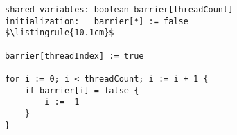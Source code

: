 \begin{minipage}
\centering
\begin{lstlisting}[mathescape, linewidth=10.1cm]
shared variables: boolean barrier[threadCount]
initialization:   barrier[*] := false
$\listingrule{10.1cm}$

barrier[threadIndex] := true

for i := 0; i < threadCount; i := i + 1 {
	if barrier[i] = false {
		i := -1
	}
}
\end{lstlisting}
\end{minipage}
